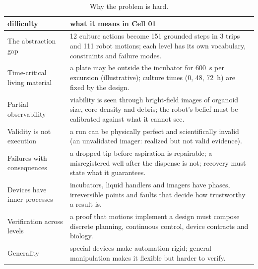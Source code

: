 \documentclass[10.5pt,a4paper]{article}
\begin{document}
\begin{table}[htbp]\centering\footnotesize\caption{Why the problem is hard.}
\begin{tabularx}{\linewidth}{@{}p{4.2cm}X@{}}\toprule difficulty & what it means in Cell 01 \\\midrule
The abstraction gap & 12 culture actions become 151 grounded steps in 3 trips and 111 robot motions; each level has its own vocabulary, constraints and failure modes. \\
Time-critical living material & a plate may be outside the incubator for 600~s per excursion (illustrative); culture times (0, 48, 72~h) are fixed by the design. \\
Partial observability & viability is seen through bright-field images of organoid size, core density and debris; the robot's belief must be calibrated against what it cannot see. \\
Validity is not execution & a run can be physically perfect and scientifically invalid (an unvalidated imager: realized but not valid evidence). \\
Failures with consequences & a dropped tip before aspiration is repairable; a misregistered well after the dispense is not; recovery must state what it guarantees. \\
Devices have inner processes & incubators, liquid handlers and imagers have phases, irreversible points and faults that decide how trustworthy a result is. \\
Verification across levels & a proof that motions implement a design must compose discrete planning, continuous control, device contracts and biology. \\
Generality & special devices make automation rigid; general manipulation makes it flexible but harder to verify. \\\bottomrule\end{tabularx}\end{table}
\end{document}
